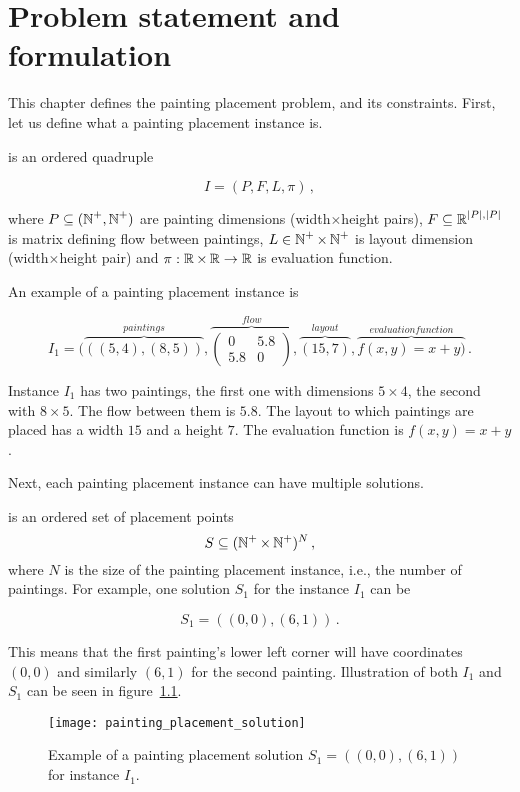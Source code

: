 \chapter{Problem statement and formulation}\label{ch:problem-statement-and-formulation}

This chapter defines the painting placement problem, and its constraints.
First, let us define what a painting placement instance is.

 is an ordered quadruple

\[
    I = (P, F, L, \pi)\,,
\]

where $P \subseteq (\operatorname*{\mathbb{N}}^+, \operatorname*{\mathbb{N}}^+)$ are painting dimensions (width$\times$height pairs),
$F \subseteq \operatorname*{\mathbb{R}}^{|P|, |P|}$ is matrix defining flow between paintings,
$L \in \operatorname*{\mathbb{N}}^+ \times \operatorname*{\mathbb{N}}^+$ is layout dimension (width$\times$height pair)
and $\pi: \operatorname*{\mathbb{R}} \times \operatorname*{\mathbb{R}} \to \operatorname*{\mathbb{R}}$ is evaluation function.

An example of a painting placement instance is

\[
    I_1 = (\overbrace{((5,4),(8,5))}^{paintings},
    \overbrace{\begin{pmatrix}
                   0   & 5.8 \\
                   5.8 & 0
    \end{pmatrix}}^{flow},
    \overbrace{(15,7)}^{layout},
    \overbrace{f(x,y) = x+y)}^{evaluation function}\,.
\]

Instance $I_1$ has two paintings, the first one with dimensions $5\times4$, the second with $8\times5$.
The flow between them is $5.8$. The layout to which paintings are placed has a width $15$ and a height $7$.
The evaluation function is $f(x,y) = x+y$.

Next, each painting placement instance can have multiple solutions.

 is an ordered set of placement points
\[
    S \subseteq (\operatorname*{\mathbb{N}^+} \times \operatorname*{\mathbb{N}^+})^N  \,,
\]
where $N$ is the size of the painting placement instance, i.e., the number of paintings.
For example, one solution $S_1$ for the instance $I_1$ can be

\[
    S_1 = ((0,0), (6,1)) \,.
\]

This means that the first painting's lower left corner will have coordinates $(0,0)$
and similarly $(6,1)$ for the second painting.
Illustration of both $I_1$ and $S_1$ can be seen in figure~\ref{fig:painting-placement-solution}.

\begin{figure}
    \texttt{[image: painting\_placement\_solution]}
    \caption[Example of a painting placement solution.]{Example of a painting placement solution $S_1 = ((0,0), (6,1))$ for instance $I_1$.}
    \label{fig:painting-placement-solution}
\end{figure}

